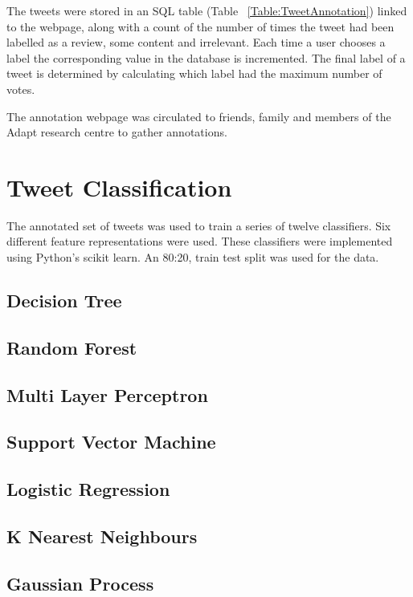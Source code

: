 The tweets were stored in an SQL table (Table ~\ref{Table:TweetAnnotation}) linked to the webpage, along with a count of the number of times the tweet had been labelled as a review, some content and irrelevant. Each time a user chooses a label the corresponding value in the database is incremented. The final label of a tweet is determined by calculating which label had the maximum number of votes. 

The annotation webpage was circulated to friends, family and members of the Adapt research centre to gather annotations.

\section{Tweet Classification}

The annotated set of tweets was used to train a series of twelve classifiers. Six different feature representations were used. These classifiers were implemented using Python's scikit learn. An 80:20, train test split was used for the data.

\subsection*{Decision Tree}

\subsection*{Random Forest}

\subsection*{Multi Layer Perceptron}

\subsection*{Support Vector Machine}

\subsection*{Logistic Regression}

\subsection*{K Nearest Neighbours}

\subsection*{Gaussian Process}

